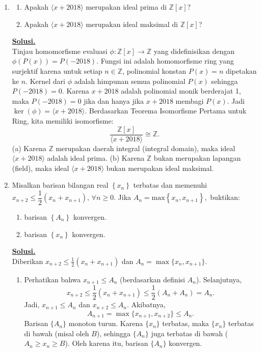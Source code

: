 \documentclass[12pt,twoside]{article}
\newenvironment{solution}
{
	\par\noindent\textbf{\underline{Solusi.}}\\
}
{
	\par
}
\begin{document}
\begin{enumerate}
  \item \begin{enumerate}
          \item Apakah $\langle x+2018 \rangle$ merupakan ideal prima di $\mathbb{Z}[x]?$
          \item Apakah $\langle x+2018 \rangle$ merupakan ideal maksimal di $\mathbb{Z}[x]$?
        \end{enumerate}

        \begin{solution}
          Tinjau homomorfisme evaluasi $\phi: \mathbb{Z}[x] \to \mathbb{Z}$ yang didefinisikan dengan $\phi(P(x)) = P(-2018)$.
          Fungsi ini adalah homomorfisme ring yang surjektif karena untuk setiap $n \in \mathbb{Z}$, polinomial konstan $P(x)=n$ dipetakan ke $n$.
          Kernel dari $\phi$ adalah himpunan semua polinomial $P(x)$ sehingga $P(-2018) = 0$. Karena $x+2018$ adalah polinomial monik berderajat 1, maka $P(-2018)=0$ jika dan hanya jika $x+2018$ membagi $P(x)$. Jadi $\ker(\phi) = \langle x+2018 \rangle$.
          Berdasarkan Teorema Isomorfisme Pertama untuk Ring, kita memiliki isomorfisme:
          \[ \frac{\mathbb{Z}[x]}{\langle x+2018 \rangle} \cong \mathbb{Z}. \]
          (a) Karena $\mathbb{Z}$ merupakan daerah integral (integral domain), maka ideal $\langle x+2018 \rangle$ adalah ideal prima.
          (b) Karena $\mathbb{Z}$ bukan merupakan lapangan (field), maka ideal $\langle x+2018 \rangle$ bukan merupakan ideal maksimal.
        \end{solution}


  \item Misalkan barisan bilangan real $\left\lbrace x_n \right\rbrace$ terbatas dan memenuhi $x_{n+2} \leq \dfrac{1}{2} (x_n+x_{n+1}),\,\forall n \geq 0$. Jika $A_n = \text{max}\left\lbrace x_n,x_{n+1} \right\rbrace,$ buktikan:
        \begin{enumerate}
          \item barisan $\left\lbrace A_n \right\rbrace$ konvergen.
          \item barisan $\left\lbrace x_n \right\rbrace$ konvergen.
        \end{enumerate}

        \begin{solution}
          Diberikan $x_{n+2} \le \frac{1}{2} (x_n+x_{n+1})$ dan $A_n = \max\{x_n,x_{n+1}\}$.
          \begin{enumerate}
            \item Perhatikan bahwa $x_{n+1} \le A_n$ (berdasarkan definisi $A_n$).
                  Selanjutnya,
                  \[ x_{n+2} \le \frac{1}{2}(x_n + x_{n+1}) \le \frac{1}{2}(A_n + A_n) = A_n. \]
                  Jadi, $x_{n+1} \le A_n$ dan $x_{n+2} \le A_n$. Akibatnya,
                  \[ A_{n+1} = \max\{x_{n+1}, x_{n+2}\} \le A_n. \]
                  Barisan $\{A_n\}$ monoton turun. Karena $\{x_n\}$ terbatas, maka $\{x_n\}$ terbatas di bawah (misal oleh $B$), sehingga $\{A_n\}$ juga terbatas di bawah ($A_n \ge x_n \ge B$). Oleh karena itu, barisan $\{A_n\}$ konvergen.


\end{enumerate}
\end{solution}
\end{enumerate}
\end{document}
